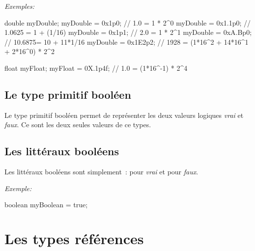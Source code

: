 \textit{Exemples:}
\begin{java}
	double myDouble;
	myDouble = 0x1p0;		// 1.0 = 1 * 2^0
	myDouble = 0x1.1p0;	// 1.0625 = 1 + (1/16)
	myDouble = 0x1p1;		// 2.0 = 1 * 2^1
	myDouble = 0xA.Bp0; // 10.6875= 10 + 11*1/16
	myDouble = 0x1E2p2; // 1928 = (1*16^2 + 14*16^1 + 2*16^0) * 2^2

	float myFloat;
	myFloat = 0X.1p4f;		// 1.0 = (1*16^-1) * 2^4

\end{java}




\subsection{Le type primitif booléen}

Le type primitif booléen permet de représenter les deux valeurs logiques
\textit{vrai} et \textit{faux}. Ce sont les deux seules valeurs de ce types. 


\subsection{Les littéraux booléens}

Les littéraux booléens sont simplement~:  pour \textit{vrai} et
 pour \textit{faux}. 

\textit{Exemple:}
\begin{java}
	boolean myBoolean = true;
\end{java}










\section{Les types références}
